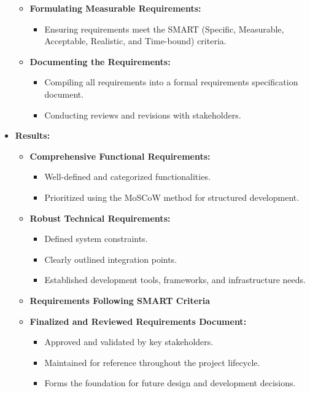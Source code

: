 \documentclass{article}
\begin{document}
\begin{itemize}[leftmargin=*, label={}]
\begin{itemize}
\begin{itemize}
        \end{itemize}
        \item \textbf{Formulating Measurable Requirements:}
        \begin{itemize}
            \item Ensuring requirements meet the SMART (Specific, Measurable, Acceptable, Realistic, and Time-bound) criteria.
        \end{itemize}
        \item \textbf{Documenting the Requirements:}
        \begin{itemize}
            \item Compiling all requirements into a formal requirements specification document.
            \item Conducting reviews and revisions with stakeholders.
        \end{itemize}
    \end{itemize}

    \item \textbf{Results:}
    \begin{itemize}
        \item \textbf{Comprehensive Functional Requirements:}
        \begin{itemize}
            \item Well-defined and categorized functionalities.
            \item Prioritized using the MoSCoW method for structured development.
        \end{itemize}
        \item \textbf{Robust Technical Requirements:}
        \begin{itemize}
            \item Defined system constraints.
            \item Clearly outlined integration points.
            \item Established development tools, frameworks, and infrastructure needs.
        \end{itemize}
        \item \textbf{Requirements Following SMART Criteria}
        \item \textbf{Finalized and Reviewed Requirements Document:}
        \begin{itemize}
            \item Approved and validated by key stakeholders.
            \item Maintained for reference throughout the project lifecycle.
            \item Forms the foundation for future design and development decisions.
        \end{itemize}
    \end{itemize}
\end{itemize}
\end{document}
